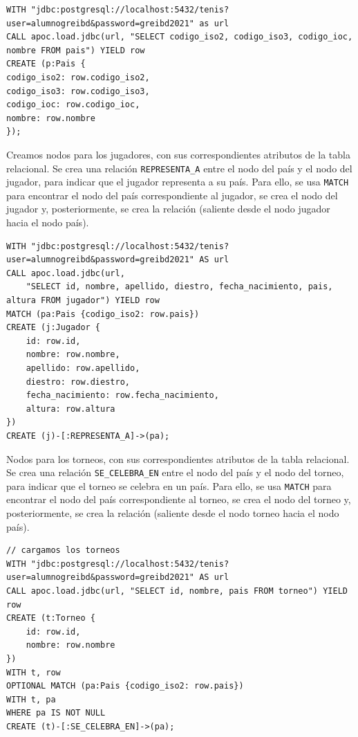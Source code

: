 \begin{verbatim}
WITH "jdbc:postgresql://localhost:5432/tenis?user=alumnogreibd&password=greibd2021" as url
CALL apoc.load.jdbc(url, "SELECT codigo_iso2, codigo_iso3, codigo_ioc, nombre FROM pais") YIELD row
CREATE (p:Pais {
codigo_iso2: row.codigo_iso2,
codigo_iso3: row.codigo_iso3,
codigo_ioc: row.codigo_ioc,
nombre: row.nombre
});
\end{verbatim}


Creamos nodos para los jugadores, con sus correspondientes atributos de la tabla relacional. Se crea una relación \texttt{REPRESENTA\_A} entre el nodo del país y el nodo del jugador, para indicar que el jugador representa a su país. Para ello, se usa \texttt{MATCH} para encontrar el nodo del país correspondiente al jugador, se crea el nodo del jugador y, posteriormente, se crea la relación (saliente desde el nodo jugador hacia el nodo país).

\begin{verbatim}
WITH "jdbc:postgresql://localhost:5432/tenis?user=alumnogreibd&password=greibd2021" AS url
CALL apoc.load.jdbc(url, 
    "SELECT id, nombre, apellido, diestro, fecha_nacimiento, pais, altura FROM jugador") YIELD row
MATCH (pa:Pais {codigo_iso2: row.pais})
CREATE (j:Jugador {
    id: row.id,
    nombre: row.nombre,
    apellido: row.apellido,
    diestro: row.diestro,
    fecha_nacimiento: row.fecha_nacimiento,
    altura: row.altura
})
CREATE (j)-[:REPRESENTA_A]->(pa);
\end{verbatim}

Nodos para los torneos, con sus correspondientes atributos de la tabla relacional. Se crea una relación \texttt{SE\_CELEBRA\_EN} entre el nodo del país y el nodo del torneo, para indicar que el torneo se celebra en un país. Para ello, se usa \texttt{MATCH} para encontrar el nodo del país correspondiente al torneo, se crea el nodo del torneo y, posteriormente, se crea la relación (saliente desde el nodo torneo hacia el nodo país).

\begin{verbatim}
// cargamos los torneos
WITH "jdbc:postgresql://localhost:5432/tenis?user=alumnogreibd&password=greibd2021" AS url
CALL apoc.load.jdbc(url, "SELECT id, nombre, pais FROM torneo") YIELD row
CREATE (t:Torneo {
    id: row.id,
    nombre: row.nombre
})
WITH t, row
OPTIONAL MATCH (pa:Pais {codigo_iso2: row.pais})
WITH t, pa
WHERE pa IS NOT NULL
CREATE (t)-[:SE_CELEBRA_EN]->(pa);
\end{verbatim}

